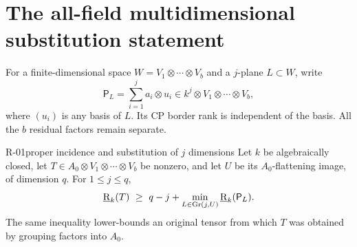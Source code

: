 \section{The all-field multidimensional substitution statement}

For a finite-dimensional space $W=V_1\otimes\cdots\otimes V_b$
and a $j$-plane $L\subset W$, write
\[
 \mathsf P_L=\sum_{i=1}^j a_i\otimes u_i
       \in k^j\otimes V_1\otimes\cdots\otimes V_b,
\]
where $(u_i)$ is any basis of $L$. Its CP border rank is independent
of the basis. All the $b$ residual factors remain separate.

\begin{finding}{R-01}{proper incidence and substitution of $j$ dimensions}
Let $k$ be algebraically closed, let
$T\in A_0\otimes V_1\otimes\cdots\otimes V_b$ be nonzero,
and let $U$ be its $A_0$-flattening image, of dimension $q$.
For $1\leq j\leq q$,
\begin{equation}\label{eq:substitution}
 \underline{\mathrm R}_k(T)\ \geq\ q-j+
       \min_{L\in\operatorname{Gr}(j,U)}\underline{\mathrm R}_k(\mathsf P_L).
\end{equation}
The same inequality lower-bounds an original tensor from which $T$
was obtained by grouping factors into $A_0$.
\end{finding}
